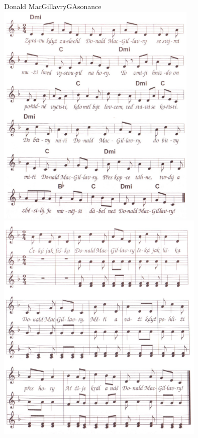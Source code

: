 \setcounter{page}{22}
\begin{song}{Donald MacGillavry}{G}{Asonance}
\includegraphics[width=0.72\textwidth]{noty/a_donald-macgallavry-1}\\
\includegraphics[width=0.75\textwidth]{noty/a_donald-macgallavry-2} \end{song} \pagebreak

